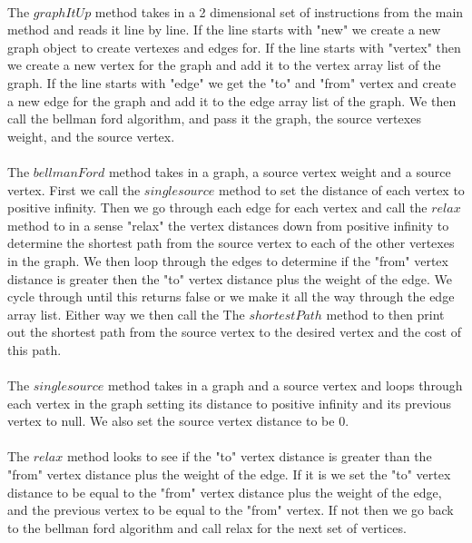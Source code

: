 \documentclass[letterpaper, 10pt,DIV=13]{scrartcl}
\numberwithin{equation}{section} %
\numberwithin{figure}{section} %
\numberwithin{table}{section} %
\begin{document}
\paragraph{} The $graphItUp$ method takes in a 2 dimensional set of instructions from the main method and reads it line by line. If the line starts with "new" we create a new graph object to create vertexes and edges for. If the line starts with "vertex" then we create a new vertex for the graph and add it to the vertex array list of the graph. If the line starts with "edge" we get the "to" and "from" vertex and create a new edge for the graph and add it to the edge array list of the graph. We then call the bellman ford algorithm, and pass it the graph, the source vertexes weight, and the source vertex.

\paragraph{} The $bellmanFord$ method takes in a graph, a source vertex weight and a source vertex. First we call the $singlesource$ method to set the distance of each vertex to positive infinity. Then we go through each edge for each vertex and call the $relax$ method to in a sense "relax" the vertex distances down from positive infinity to determine the shortest path from the source vertex to each of the other vertexes in the graph. We then loop through the edges to determine if the "from" vertex distance is greater then the "to" vertex distance plus the weight of the edge. We cycle through until this returns false or we make it all the way through the edge array list. Either way we then call the  The $shortestPath$ method to then print out the shortest path from the source vertex to the desired vertex and the cost of this path.

\paragraph{} The $singlesource$ method takes in a graph and a source vertex and loops through each vertex in the graph setting its distance to positive infinity and its previous vertex to null. We also set the source vertex distance to be 0.

\paragraph{} The $relax$ method looks to see if the "to" vertex distance is greater than the "from" vertex distance plus the weight of the edge. If it is we set the "to" vertex distance to be equal to the "from" vertex distance plus the weight of the edge, and the previous vertex to be equal to the "from" vertex. If not then we go back to the bellman ford algorithm and call relax for the next set of vertices.
\end{document}

